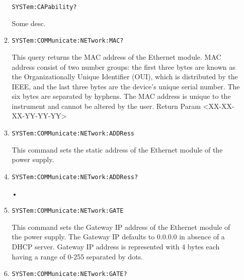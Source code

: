 \documentclass[a4paper,10pt]{article}
\begin{document}
\begin{enumerate}
\begin{enumerate}
            \begin{verbatim}SYSTem:CAPability?\end{verbatim}
            \begin{description}
                Some desc.
            \end{description}
        \item 
            \begin{verbatim}SYSTem:COMMunicate:NETwork:MAC?\end{verbatim}
            \begin{description}
                This query returns the MAC address of the Ethernet module. MAC address consist of two number groups: the first three bytes are known as the Organizationally Unique Identifier (OUI), which is distributed by the IEEE, and the last three bytes are the device’s unique serial number. The six bytes are separated by hyphens. The MAC address is unique to the instrument and cannot be altered by the user.
                \newline
                Return Param <XX-XX-XX-YY-YY-YY>
		    \end{description}
		\item 
		    \begin{verbatim}SYSTem:COMMunicate:NETwork:ADDRess\end{verbatim}
		    \begin{description}
		        This command sets the static address of the Ethernet module of the power supply.
		    \end{description}
		\item 
		    \begin{verbatim}SYSTem:COMMunicate:NETwork:ADDRess?\end{verbatim}
		    \begin{description}
		        •
		    \end{description}
		\item 
		    \begin{verbatim}SYSTem:COMMunicate:NETwork:GATE\end{verbatim}
		    \begin{description}
		        This command sets the Gateway IP address of the Ethernet module of the power supply. The Gateway IP defaults to 0.0.0.0 in absence of a DHCP server. Gateway IP address is represented with 4 bytes each having a range of 0-255 separated by dots.
		    \end{description}
		\item 
		    \begin{verbatim}SYSTem:COMMunicate:NETwork:GATE?\end{verbatim}

\end{enumerate}
\end{enumerate}
\end{document}
